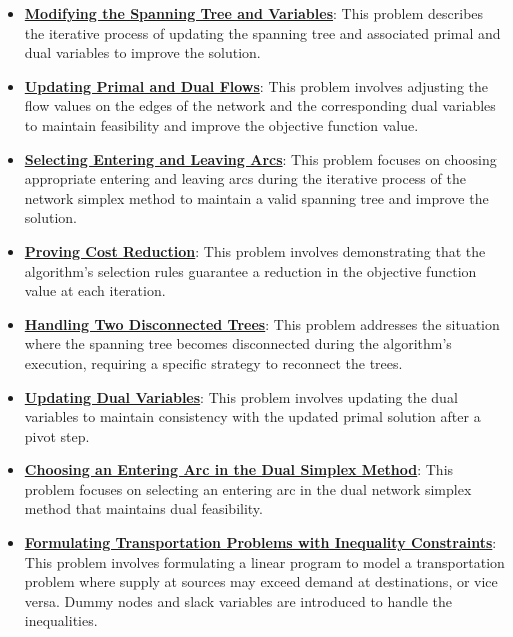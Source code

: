 \documentclass{article}%
\begin{document}
\begin{itemize}[leftmargin=*]
\item \href{https://www.math.purdue.edu/~yipn/421/2024-11-07-NetSimplex.pdf#page=6}{\textbf{Modifying the Spanning Tree and Variables}}: This problem describes the iterative process of updating the spanning tree and associated primal and dual variables to improve the solution.%
\item \href{https://www.math.purdue.edu/~yipn/421/2024-11-07-NetSimplex.pdf#page=6}{\textbf{Updating Primal and Dual Flows}}: This problem involves adjusting the flow values on the edges of the network and the corresponding dual variables to maintain feasibility and improve the objective function value.%
\item \href{https://www.math.purdue.edu/~yipn/421/2024-11-07-NetSimplex.pdf#page=6}{\textbf{Selecting Entering and Leaving Arcs}}: This problem focuses on choosing appropriate entering and leaving arcs during the iterative process of the network simplex method to maintain a valid spanning tree and improve the solution.%
\item \href{https://www.math.purdue.edu/~yipn/421/2024-11-07-NetSimplex.pdf#page=9}{\textbf{Proving Cost Reduction}}: This problem involves demonstrating that the algorithm's selection rules guarantee a reduction in the objective function value at each iteration.%
\item \href{https://www.math.purdue.edu/~yipn/421/2024-11-07-NetSimplex.pdf#page=11}{\textbf{Handling Two Disconnected Trees}}: This problem addresses the situation where the spanning tree becomes disconnected during the algorithm's execution, requiring a specific strategy to reconnect the trees.%
\item \href{https://www.math.purdue.edu/~yipn/421/2024-11-07-NetSimplex.pdf#page=14}{\textbf{Updating Dual Variables}}: This problem involves updating the dual variables to maintain consistency with the updated primal solution after a pivot step.%
\item \href{https://www.math.purdue.edu/~yipn/421/2024-11-07-NetSimplex.pdf#page=35}{\textbf{Choosing an Entering Arc in the Dual Simplex Method}}: This problem focuses on selecting an entering arc in the dual network simplex method that maintains dual feasibility.%
\item \href{https://www.math.purdue.edu/~yipn/421/2024-11-14-NetAppls.pdf#page=3}{\textbf{Formulating Transportation Problems with Inequality Constraints}}: This problem involves formulating a linear program to model a transportation problem where supply at sources may exceed demand at destinations, or vice versa. Dummy nodes and slack variables are introduced to handle the inequalities.%

\end{itemize}
\end{document}
